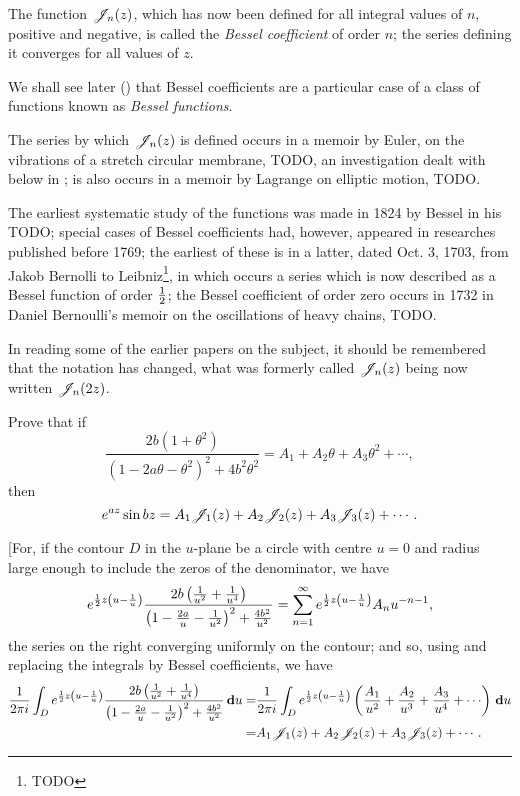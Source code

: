 The function $\mathscr{J}_{n}(z)$, which has now been defined for all integral
values of $n$, positive and negative, is called the
\emph{Bessel coefficient} of order $n$; the series defining it
converges for all values of $z$.

We shall see later () that Bessel
coefficients are a particular case of a class of functions known as
\emph{Bessel functions}.

The series by which $\mathscr{J}_{n}(z)$ is defined occurs in a memoir by Euler,
on the vibrations of a stretch circular membrane, TODO,
an investigation dealt with below in ;
is also occurs in a memoir by Lagrange on elliptic motion, TODO.

The earliest systematic study of the functions was made in 1824 by
Bessel in his TODO; special cases of Bessel coefficients had, however,
appeared in researches published before 1769; the earliest of these is
in a latter, dated Oct. 3, 1703, from Jakob Bernolli to
Leibniz\footnote{TODO}, in which occurs a series which is now
described as a Bessel function of order $\frac{1}{2}$; the Bessel
coefficient of order zero occurs in 1732 in Daniel Bernoulli's memoir
on the oscillations of heavy chains, TODO.

In reading some of the earlier papers on the subject, it should be
remembered that the notation has changed, what was formerly called
$\mathscr{J}_{n}(z)$ being now written $\mathscr{J}_{n}(2z)$.
\begin{wandwexample}
  Prove that if
  $$
  \frac{ 2b(1+\theta^{2})  }{ (1-2a\theta-\theta^{2})^{2} + 4b^{2}\theta^{2}  }
  =
  A_{1} + A_{2} \theta + A_{3} \theta^{2} + \cdots,
  $$
  then
  $$
  e^{az} \sin bz
  =
  A_{1} \mathscr{J}_{1}(z) + A_{2} \mathscr{J}_{2}(z) + A_{3} \mathscr{J}_{3}(z) + \cdots.
  $$
\end{wandwexample}

[For, if the contour $D$ in the $u$-plane be a circle with centre
$u=0$ and radius large enough to include the zeros of the denominator,
we have
$$
e^{\frac{1}{2} z \left( u - \frac{1}{u} \right)}
\frac{ 2b \left( \frac{1}{u^{2}} + \frac{1}{u^{4}}  \right)  }{ \left( 1 -
    \frac{2a}{u} - \frac{1}{u^{2}} \right)^{2}
  + \frac{4 b^{2}}{u^{2}}  }
=
\sum_{n=1}^{\infty}
e^{\frac{1}{2} z \left( u - \frac{1}{u} \right)} A_{n} u^{-n-1},
$$
the series on the right converging uniformly on the contour; and so,
using  and replacing the integrals by Bessel
coefficients, we have
\begin{align*}
  \frac{1}{2\pi i}
  \int_{D}
  e^{\half z \theparen{u - \frac{1}{u}}}
  \frac{ 2b \theparen{\frac{1}{u^{2}} + \frac{1}{u^{4}} }  }{ \theparen{1 -
      \frac{2a}{u} - \frac{1}{u^{2}}}^{2}
    + \frac{4 b^{2}}{u^{2}}  }
  \dmeasure u
  =& \frac{1}{2\pi i}
  \int_{D}
  e^{\half z \theparen{u - \frac{1}{u}}}
  \theparen{ \frac{A_{1}}{u^{2}} + \frac{A_{2}}{u^{3}} + \frac{A_{3}}{u^{4}} +
    \cdots  }
  \dmeasure u \\
  =& A_{1} \besJ_{1}(z) + A_{2} \besJ_{2}(z) + A_{3} \besJ_{3}(z) + \cdots .
\end{align*}

